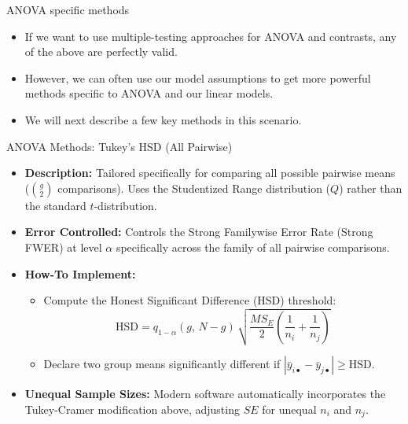 \begin{frame}{ANOVA specific methods}
  \begin{itemize}
    \item If we want to use multiple-testing approaches for ANOVA and contrasts, any of the above are perfectly valid.
    \item However, we can often use our model assumptions to get more powerful methods specific to ANOVA and our linear models.
    \item We will next describe a few key methods in this scenario.
  \end{itemize}
\end{frame}

\begin{frame}{ANOVA Methods: Tukey's HSD (All Pairwise)}
  \begin{itemize}
    \item \textbf{Description:} Tailored specifically for comparing all possible pairwise means ($\binom{g}{2}$ comparisons). Uses the Studentized Range distribution ($Q$) rather than the standard $t$-distribution.
    \item \textbf{Error Controlled:} Controls the \alert{Strong Familywise Error Rate (Strong FWER)} at level $\alpha$ specifically across the family of all pairwise comparisons.
    \item \textbf{How-To Implement:}
    \begin{itemize}
      \item Compute the Honest Significant Difference (HSD) threshold:
      $$
      \text{HSD} = q_{1-\alpha}(g, \, N-g) \, \sqrt{\frac{MS_E}{2} \left(\frac{1}{n_i} + \frac{1}{n_j}\right)}
      $$
      \item Declare two group means significantly different if $|\bar{y}_{i\bullet} - \bar{y}_{j\bullet}| \ge \text{HSD}$.
    \end{itemize}
    \item \textbf{Unequal Sample Sizes:} Modern software automatically incorporates the \alert{Tukey-Cramer} modification above, adjusting $SE$ for unequal $n_i$ and $n_j$.
  \end{itemize}
  
\begin{knitrout}\small
{}\color{fgcolor}\begin{kframe}
\begin{alltt}
 \hlkwb{<-}   
  \hldef{=} \hldef{)}  
\end{alltt}
\end{kframe}


\end{knitrout}
\end{frame}
